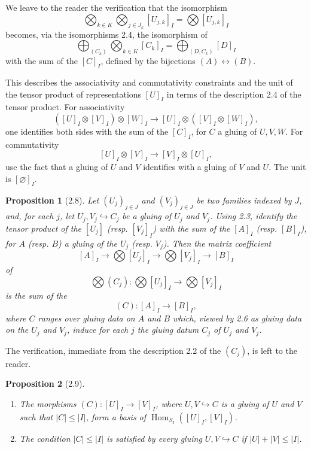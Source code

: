 \documentclass[11pt]{article}
\newcommand{\Hom}{\operatorname{Hom}}
\theoremstyle{deligne}
\newtheorem*{proposition*}{Proposition}
\newcommand{\para}[1]{\vspace{0.65em}\noindent{\bfseries #1}\quad}
\begin{document}
We leave to the reader the verification that the isomorphism
\[
  \bigotimes_{k\in K}\bigotimes_{j\in J_k}[U_{j,k}]_I
  =
  \bigotimes [U_{j,k}]_I
\]
becomes, via the isomorphisms 2.4, the isomorphism of
\[
  \bigoplus_{(C_k)}\bigotimes_{k\in K}[C_k]_I
  =
  \bigoplus_{(D,C_k)}[D]_I
\]
with the sum of the \([C]_I\), defined by the bijections \((A)\leftrightarrow(B)\).

\para{2.7.}
This describes the associativity and commutativity constraints and the unit of the tensor product of representations \([U]_I\) in terms of the description 2.4 of the tensor product. For associativity
\[
  ([U]_I\otimes[V]_I)\otimes[W]_I
  \longrightarrow
  [U]_I\otimes([V]_I\otimes[W]_I),
\]
one identifies both sides with the sum of the \([C]_I\), for \(C\) a gluing of \(U,V,W\). For commutativity
\[
  [U]_I\otimes[V]_I\longrightarrow [V]_I\otimes[U]_I,
\]
use the fact that a gluing of \(U\) and \(V\) identifies with a gluing of \(V\) and \(U\). The unit is \([\varnothing]_I\).

\begin{proposition*}[2.8]
Let \((U_j)_{j\in J}\) and \((V_j)_{j\in J}\) be two families indexed by \(J\), and, for each \(j\), let \(U_j,V_j\hookrightarrow C_j\) be a gluing of \(U_j\) and \(V_j\). Using 2.3, identify the tensor product of the \([U_j]\) (resp. \([V_j]_I\)) with the sum of the \([A]_I\) (resp. \([B]_I\)), for \(A\) (resp. \(B\)) a gluing of the \(U_j\) (resp. \(V_j\)). Then the matrix coefficient
\[
  [A]_I\longrightarrow \bigotimes[U_j]_I
  \longrightarrow \bigotimes[V_j]_I
  \longrightarrow [B]_I
\]
of
\[
  \bigotimes(C_j):\bigotimes[U_j]_I\longrightarrow \bigotimes[V_j]_I
\]
is the sum of the
\[
  (C):[A]_I\longrightarrow[B]_I,
\]
where \(C\) ranges over gluing data on \(A\) and \(B\) which, viewed by 2.6 as gluing data on the \(U_j\) and \(V_j\), induce for each \(j\) the gluing datum \(C_j\) of \(U_j\) and \(V_j\).
\end{proposition*}

The verification, immediate from the description 2.2 of the \((C_j)\), is left to the reader.

\begin{proposition*}[2.9]
\begin{enumerate}[label=(\roman*)]
\item The morphisms \((C):[U]_I\to[V]_I\), where \(U,V\hookrightarrow C\) is a gluing of \(U\) and \(V\) such that \(|C|\le |I|\), form a basis of \(\Hom_{S_I}([U]_I,[V]_I)\).
\item The condition \(|C|\le |I|\) is satisfied by every gluing \(U,V\hookrightarrow C\) if \(|U|+|V|\le |I|\).
\end{enumerate}
\end{proposition*}
\end{document}
